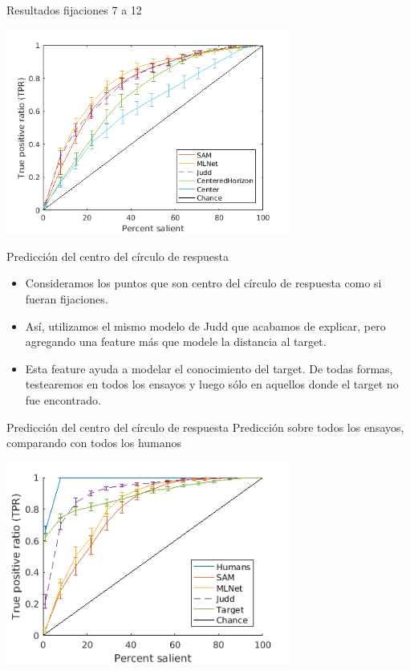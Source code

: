 \documentclass[compress]{beamer}
\begin{document}
\begin{frame}{Resultados fijaciones 7 a 12}
\begin{center}
\includegraphics[width=0.7\textwidth]{images/results_fix_7_to_12_all.png} 
\end{center}
\end{frame}

\begin{frame}{Predicción del centro del círculo de respuesta}
\begin{itemize}
\item Consideramos los puntos que son centro del círculo de respuesta como si fueran fijaciones.
\item Así, utilizamos el mismo modelo de Judd que acabamos de explicar, pero agregando una feature más que modele la distancia al target.
\item Esta feature ayuda a modelar el conocimiento del target. De todas formas, testearemos en todos los ensayos y luego sólo en aquellos donde el target no fue encontrado.
\end{itemize}
\end{frame}

\begin{frame}{Predicción del centro del círculo de respuesta}
{Predicción sobre todos los ensayos, comparando con todos los humanos}
\begin{center}
\includegraphics[width=0.7\textwidth]{images/guess_all_1.png} 
\end{center}
\end{frame}
\end{document}
